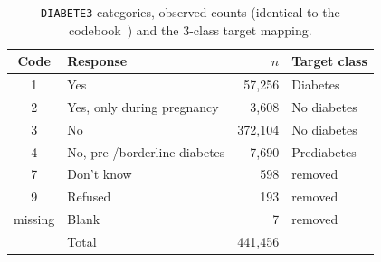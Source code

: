 \begin{table}[t]
\centering\footnotesize
\caption{\texttt{DIABETE3} categories, observed counts (identical to the codebook~\cite{cdc2015codebook}) and the 3-class target mapping.}
\label{tab:target}
\begin{tabular}{@{}clrl@{}}
\toprule
Code & Response & $n$ & Target class\\
\midrule
1 & Yes & 57,256 & Diabetes \\
2 & Yes, only during pregnancy & 3,608 & No diabetes \\
3 & No & 372,104 & No diabetes \\
4 & No, pre-/borderline diabetes & 7,690 & Prediabetes \\
7 & Don't know & 598 & removed \\
9 & Refused & 193 & removed \\
missing & Blank & 7 & removed \\
\midrule
 & Total & 441,456 & \\
\bottomrule
\end{tabular}
\end{table}
